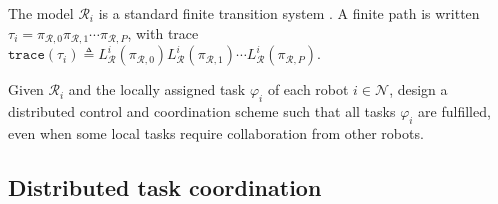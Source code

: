 The model $\mathcal{R}_i$ is a standard finite transition system
\citep{baier2008principles}. A finite path is written
$\tau_i=\pi_{\mathcal{R},0}\pi_{\mathcal{R},1}\cdots\pi_{\mathcal{R},P}$,
with trace
$\texttt{trace}(\tau_i)\triangleq
L_{\mathcal{R}}^i(\pi_{\mathcal{R},0})
L_{\mathcal{R}}^i(\pi_{\mathcal{R},1}) \cdots
L_{\mathcal{R}}^i(\pi_{\mathcal{R},P})$. 

\begin{problem}
\label{ch03:big-problem}
Given $\mathcal{R}_i$ and the locally assigned task $\varphi_i$ of each robot
$i \in \mathcal{N}$, design a distributed control and coordination scheme such
that all tasks $\varphi_i$ are fulfilled, even when some local tasks require
collaboration from other robots.
\end{problem}

\subsection{Distributed task coordination}
\label{ch03:sec:coordination}


